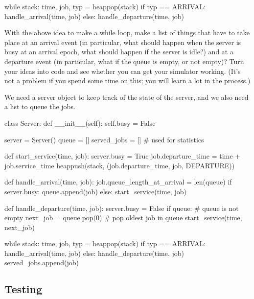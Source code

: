   \begin{pyblock}
while stack:
    time, job, typ = heappop(stack)
    if typ == ARRIVAL:
        handle_arrival(time, job)
    else:
        handle_departure(time, job)
    
  \end{pyblock}

\begin{exercise}
  With the above idea to make a while loop, make a list of things that have to take place at an arrival event (in particular, what should happen when the server is busy at an arrival epoch, what should happen if the server is idle?)
  and at a departure event (in particular, what if the queue is empty, or not empty)?
  Turn your ideas into code and see whether you can get your simulator working.
  (It's not a problem if you spend some time on this; you will learn a lot in the process.)

\begin{solution}
We need a server object to keep track of the state of the server, and we also need  a list to queue the jobs. 

  \begin{pyblock}
class Server:
    def __init__(self):
        self.busy = False

server = Server()
queue = []
served_jobs = [] # used for statistics

def start_service(time, job):
    server.busy = True
    job.departure_time = time + job.service_time
    heappush(stack, (job.departure_time, job, DEPARTURE))

def handle_arrival(time, job):
    job.queue_length_at_arrival = len(queue)
    if server.busy:
        queue.append(job)
    else:
        start_service(time, job)
        
def handle_departure(time, job):
    server.busy = False
    if queue: # queue is not empty
        next_job = queue.pop(0) # pop oldest job in queue
        start_service(time, next_job)
        
while stack:
    time, job, typ = heappop(stack)
    if typ == ARRIVAL:
        handle_arrival(time, job)
    else:
        handle_departure(time, job)
        served_jobs.append(job)

  \end{pyblock}
\end{solution}

\end{exercise}

\subsection{Testing}
\label{sec:testing}

